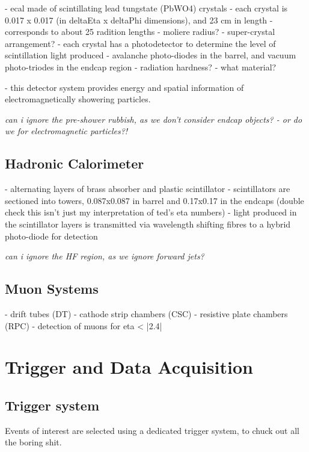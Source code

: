 - ecal made of scintillating lead tungstate (PbWO4) crystals
    - each crystal is 0.017 x 0.017 (in deltaEta x deltaPhi dimensions), and 23 
    cm in length
        -   corresponds to about 25 radition lengths
        - moliere radius?
    - super-crystal arrangement?
- each crystal has a photodetector to determine the level of scintillation light
produced
    - avalanche photo-diodes in the barrel, and vacuum photo-triodes in the 
    endcap region
    - radiation hardness?
    - what material?

- this detector system provides energy and spatial information of
electromagnetically showering particles.

\emph{can i ignore the pre-shower rubbish, as we don't consider endcap objects? 
- or do we for electromagnetic particles?!}

\subsection{Hadronic Calorimeter}

- alternating layers of brass absorber and plastic scintillator
- scintillators are sectioned into towers, 0.087x0.087 in barrel and 0.17x0.17 
in the endcaps (double check this isn't just my interpretation of ted's eta 
numbers)
- light produced in the scintillator layers is transmitted via wavelength 
shifting fibres to a hybrid photo-diode for detection

\emph{can i ignore the HF region, as we ignore forward jets?}

\subsection{Muon Systems}

- drift tubes (DT)
- cathode strip chambers (CSC)
- resistive plate chambers (RPC)
- detection of muons for eta < |2.4|

\section{Trigger and Data Acquisition}  %
\label{sec:detector_daq}

\subsection{Trigger system}
Events of interest are selected using a dedicated trigger system, to chuck out 
all the boring shit.

